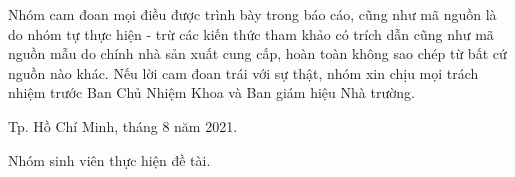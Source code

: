 Nhóm cam đoan mọi điều được trình bày trong báo cáo, cũng như mã nguồn là do nhóm tự thực hiện - trừ các kiến thức tham khảo có trích dẫn cũng như mã nguồn mẫu do chính nhà sản xuất cung cấp, hoàn toàn không sao chép từ bất cứ nguồn nào khác. Nếu lời cam đoan trái với sự thật, nhóm xin chịu mọi trách nhiệm trước Ban Chủ Nhiệm Khoa và Ban giám hiệu Nhà trường.
\begin{flushright}
Tp. Hồ Chí Minh, tháng 8 năm 2021.\par

Nhóm sinh viên thực hiện đề tài.
\end{flushright}